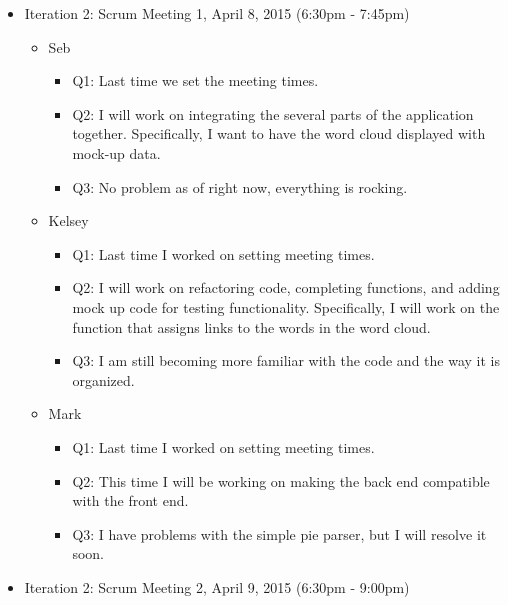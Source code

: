 \documentclass[]{article}
\begin{document}
\begin{itemize}
\itemsep1pt\parskip0pt
\item
  Iteration 2: Scrum Meeting 1, April 8, 2015 (6:30pm - 7:45pm)

  \begin{itemize}
  \itemsep1pt\parskip0pt
  \item
    Seb

    \begin{itemize}
    \itemsep1pt\parskip0pt
    \item
      Q1: Last time we set the meeting times.
    \item
      Q2: I will work on integrating the several parts of the
      application together. Specifically, I want to have the word cloud
      displayed with mock-up data.
    \item
      Q3: No problem as of right now, everything is rocking.
    \end{itemize}
  \item
    Kelsey

    \begin{itemize}
    \itemsep1pt\parskip0pt
    \item
      Q1: Last time I worked on setting meeting times.
    \item
      Q2: I will work on refactoring code, completing functions, and
      adding mock up code for testing functionality. Specifically, I
      will work on the function that assigns links to the words in the
      word cloud.
    \item
      Q3: I am still becoming more familiar with the code and the way it
      is organized.
    \end{itemize}
  \item
    Mark

    \begin{itemize}
    \itemsep1pt\parskip0pt
    \item
      Q1: Last time I worked on setting meeting times.
    \item
      Q2: This time I will be working on making the back end compatible
      with the front end.
    \item
      Q3: I have problems with the simple pie parser, but I will resolve
      it soon.
    \end{itemize}
  \end{itemize}
\item
  Iteration 2: Scrum Meeting 2, April 9, 2015 (6:30pm - 9:00pm)


\end{itemize}
\end{document}
